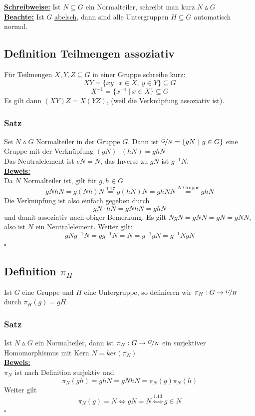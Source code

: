 \documentclass[a4paper, pagesize=pdftex, pdftex, twoside, headsepline, index=totoc,toc=listof, fontsize=10pt, cleardoublepage=empty, headinclude, DIV=13, BCOR=13mm]{scrartcl}
\newcommand{\bet}[1]{\uline{\textbf{#1}}} %
\begin{document}
\bet{Schreibweise:} Ist $N\subseteq G$ ein Normalteiler, schreibt man kurz $N\vartriangle G$\\

\bet{Beachte:} Ist $G$ \uline{abelsch}, dann sind alle Untergruppen $H\subseteq G$ automatisch normal.

\subsection{Definition Teilmengen assoziativ}
\label{sub:teilmengen}
Für Teilmengen $X,Y,Z \subseteq G$ in einer Gruppe schreibe kurz:\\
\[XY=\{xy~|~x\in X,~y\in Y\}\subseteq G \]
\[X^{-1}=\{x^{-1}~|~x\in X \}\subseteq G \]
Es gilt dann $(XY)Z=X(YZ)$, (weil die Verknüpfung assoziativ ist).
\subsubsection*{Satz}
Sei $N\vartriangle G$ Normalteiler in der Gruppe $G$. Dann ist $\nicefrac{G}{N}=\{gN~|~g\in G \}$ eine Gruppe mit der Verknüpfung $(gN)\cdot (hN)=ghN$\\
Das Neutralelement ist $eN=N$, das Inverse zu $gN$ ist $g^{-1}N$.\\
\bet{Beweis:}\\
Da $N$ Normalteiler ist, gilt für $g,h \in G$
\[gNhN=g(Nh)N\stackrel{\hyperref[sub:normalteiler]{1.17}}{=}g(hN)N=ghNN\stackrel{N\text{ Gruppe}}{=}ghN \]
Die Verknüpfung ist also einfach gegeben durch
\[gN\cdot hN=gNhN=ghN \]
und damit assoziativ nach obiger Bemerkung. Es gilt $NgN=gNN=gN=gNN$, also ist $N$ ein Neutralelement. Weiter gilt:
\[gNg^{-1}N=gg^{-1}N=N=g^{-1}gN=g^{-1}NgN \]
\hfill $\square$

\subsection{Definition $\pi_H$}
\label{def_pi_H}
Ist $G$ eine Gruppe und $H$ eine Untergruppe, so definieren wir $\pi_H: G \to \nicefrac{G}{H}$ durch $\pi_H(g)=gH$.

\subsubsection*{Satz}
Ist $N \vartriangle G$ ein Normalteiler, dann ist $\pi_N: G \to \nicefrac{G}{N}$ ein surjektiver Homomorphismus mit Kern $N=ker(\pi_N)$.\\
\bet{Beweis:}\\
$\pi_N$ ist nach Definition surjektiv und \[\pi_N(gh)=ghN=gNhN=\pi_N(g)\pi_N(h)\]
Weiter gilt \[\pi_N(g)=N \Longleftrightarrow gN=N \stackrel{\hyperref[sub:nebenklassen]{1.13}}{\Longleftrightarrow} g\in N\]
\hfill $\square$
\end{document}
